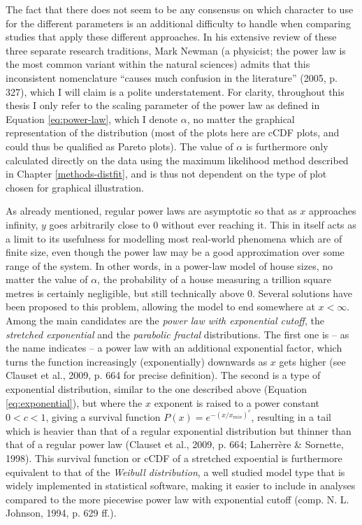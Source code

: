 \documentclass[
  12pt,
]{book}
\begin{document}
The fact that there does not seem to be any consensus on which character to use for the different parameters is an additional difficulty to handle when comparing studies that apply these different approaches. In his extensive review of these three separate research traditions, Mark Newman (a physicist; the power law is the most common variant within the natural sciences) admits that this inconsistent nomenclature ``causes much confusion in the literature'' (2005, p. 327), which I will claim is a polite understatement. For clarity, throughout this thesis I only refer to the scaling parameter of the power law as defined in Equation \eqref{eq:power-law}, which I denote \(\alpha\), no matter the graphical representation of the distribution (most of the plots here are cCDF plots, and could thus be qualified as Pareto plots). The value of \(\alpha\) is furthermore only calculated directly on the data using the maximum likelihood method described in Chapter \ref{methods-distfit}, and is thus not dependent on the type of plot chosen for graphical illustration.

As already mentioned, regular power laws are asymptotic so that as \(x\) approaches infinity, \(y\) goes arbitrarily close to \(0\) without ever reaching it. This in itself acts as a limit to its usefulness for modelling most real-world phenomena which are of finite size, even though the power law may be a good approximation over some range of the system. In other words, in a power-law model of house sizes, no matter the value of \(\alpha\), the probability of a house measuring a trillion square metres is certainly negligible, but still technically above \(0\). Several solutions have been proposed to this problem, allowing the model to end somewhere at \(x < \infty\). Among the main candidates are the \emph{power law with exponential cutoff}, the \emph{stretched exponential} and the \emph{parabolic fractal} distributions. The first one is -- as the name indicates -- a power law with an additional exponential factor, which turns the function increasingly (exponentially) downwards as \(x\) gets higher (see Clauset et al., 2009, p. 664 for precise definition). The second is a type of exponential distribution, similar to the one described above (Equation \eqref{eq:exponential}), but where the \(x\) exponent is raised to a power constant \(0 < c <1\), giving a survival function \(P(x) = e^{-(x/x_{min})^c}\), resulting in a tail which is heavier than that of a regular exponential distribution but thinner than that of a regular power law (Clauset et al., 2009, p. 664; Laherrère \& Sornette, 1998). This survival function or cCDF of a stretched expoential is furthermore equivalent to that of the \emph{Weibull distribution}, a well studied model type that is widely implemented in statistical software, making it easier to include in analyses compared to the more piecewise power law with exponential cutoff (comp. N. L. Johnson, 1994, p. 629 ff.).
\end{document}
